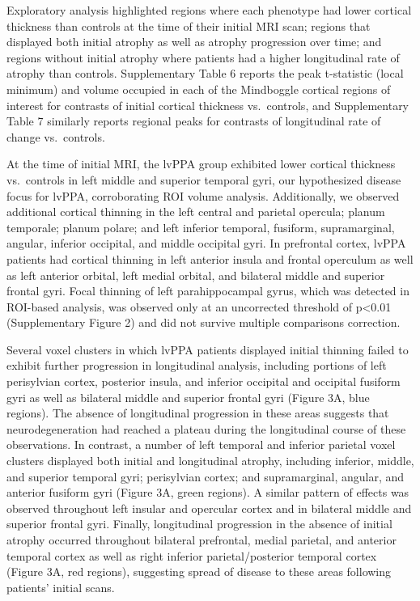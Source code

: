\documentclass[]{article}
\begin{document}
Exploratory analysis highlighted regions where each phenotype had lower
cortical thickness than controls at the time of their initial MRI scan;
regions that displayed both initial atrophy as well as atrophy
progression over time; and regions without initial atrophy where
patients had a higher longitudinal rate of atrophy than controls.
Supplementary Table 6 reports the peak t-statistic (local minimum) and
volume occupied in each of the Mindboggle cortical regions of interest
for contrasts of initial cortical thickness vs.~controls, and
Supplementary Table 7 similarly reports regional peaks for contrasts of
longitudinal rate of change vs.~controls.

At the time of initial MRI, the lvPPA group exhibited lower cortical
thickness vs.~controls in left middle and superior temporal gyri, our
hypothesized disease focus for lvPPA, corroborating ROI volume analysis.
Additionally, we observed additional cortical thinning in the left
central and parietal opercula; planum temporale; planum polare; and left
inferior temporal, fusiform, supramarginal, angular, inferior occipital,
and middle occipital gyri. In prefrontal cortex, lvPPA patients had
cortical thinning in left anterior insula and frontal operculum as well
as left anterior orbital, left medial orbital, and bilateral middle and
superior frontal gyri. Focal thinning of left parahippocampal gyrus,
which was detected in ROI-based analysis, was observed only at an
uncorrected threshold of p\textless{}0.01 (Supplementary Figure 2) and
did not survive multiple comparisons correction.

Several voxel clusters in which lvPPA patients displayed initial
thinning failed to exhibit further progression in longitudinal analysis,
including portions of left perisylvian cortex, posterior insula, and
inferior occipital and occipital fusiform gyri as well as bilateral
middle and superior frontal gyri (Figure 3A, blue regions). The absence
of longitudinal progression in these areas suggests that
neurodegeneration had reached a plateau during the longitudinal course
of these observations. In contrast, a number of left temporal and
inferior parietal voxel clusters displayed both initial and longitudinal
atrophy, including inferior, middle, and superior temporal gyri;
perisylvian cortex; and supramarginal, angular, and anterior fusiform
gyri (Figure 3A, green regions). A similar pattern of effects was
observed throughout left insular and opercular cortex and in bilateral
middle and superior frontal gyri. Finally, longitudinal progression in
the absence of initial atrophy occurred throughout bilateral prefrontal,
medial parietal, and anterior temporal cortex as well as right inferior
parietal/posterior temporal cortex (Figure 3A, red regions), suggesting
spread of disease to these areas following patients' initial scans.
\end{document}
